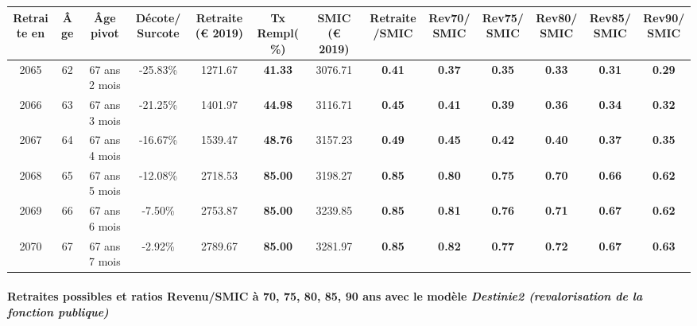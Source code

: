 { \scriptsize \begin{center} 
\begin{tabular}[htb]{|c|c||c|c||c|c||c||c|c|c|c|c|c|} 
\hline 
 Retraite en &  Âge &  Âge pivot &  Décote/Surcote &  Retraite (\euro{} 2019) &  Tx Rempl(\%) &  SMIC (\euro{} 2019) &  Retraite/SMIC &  Rev70/SMIC &  Rev75/SMIC &  Rev80/SMIC &  Rev85/SMIC &  Rev90/SMIC \\ 
\hline \hline 
 2065 &  62 &  67 ans 2 mois &  -25.83\% &  1271.67 &  {\bf 41.33} &  3076.71 &  {\bf {\color{red} 0.41}} &  {\bf {\color{red} 0.37}} &  {\bf {\color{red} 0.35}} &  {\bf {\color{red} 0.33}} &  {\bf {\color{red} 0.31}} &  {\bf {\color{red} 0.29}} \\ 
\hline 
 2066 &  63 &  67 ans 3 mois &  -21.25\% &  1401.97 &  {\bf 44.98} &  3116.71 &  {\bf {\color{red} 0.45}} &  {\bf {\color{red} 0.41}} &  {\bf {\color{red} 0.39}} &  {\bf {\color{red} 0.36}} &  {\bf {\color{red} 0.34}} &  {\bf {\color{red} 0.32}} \\ 
\hline 
 2067 &  64 &  67 ans 4 mois &  -16.67\% &  1539.47 &  {\bf 48.76} &  3157.23 &  {\bf {\color{red} 0.49}} &  {\bf {\color{red} 0.45}} &  {\bf {\color{red} 0.42}} &  {\bf {\color{red} 0.40}} &  {\bf {\color{red} 0.37}} &  {\bf {\color{red} 0.35}} \\ 
\hline 
 2068 &  65 &  67 ans 5 mois &  -12.08\% &  2718.53 &  {\bf 85.00} &  3198.27 &  {\bf {\color{red} 0.85}} &  {\bf {\color{red} 0.80}} &  {\bf {\color{red} 0.75}} &  {\bf {\color{red} 0.70}} &  {\bf {\color{red} 0.66}} &  {\bf {\color{red} 0.62}} \\ 
\hline 
 2069 &  66 &  67 ans 6 mois &  -7.50\% &  2753.87 &  {\bf 85.00} &  3239.85 &  {\bf {\color{red} 0.85}} &  {\bf {\color{red} 0.81}} &  {\bf {\color{red} 0.76}} &  {\bf {\color{red} 0.71}} &  {\bf {\color{red} 0.67}} &  {\bf {\color{red} 0.62}} \\ 
\hline 
 2070 &  67 &  67 ans 7 mois &  -2.92\% &  2789.67 &  {\bf 85.00} &  3281.97 &  {\bf {\color{red} 0.85}} &  {\bf {\color{red} 0.82}} &  {\bf {\color{red} 0.77}} &  {\bf {\color{red} 0.72}} &  {\bf {\color{red} 0.67}} &  {\bf {\color{red} 0.63}} \\ 
\hline 
\hline 
\end{tabular} 
\end{center} } 
\paragraph{Retraites possibles et ratios Revenu/SMIC à 70, 75, 80, 85, 90 ans avec le modèle \emph{Destinie2 (revalorisation de la fonction publique)}}  
 
